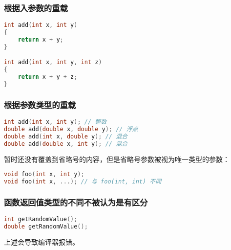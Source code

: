 \documentclass[../../LearnCpp.tex]{subfiles}
\begin{document}
\subsubsection*{根据入参数的重载}

\begin{lstlisting}[language=C++]
int add(int x, int y)
{
    return x + y;
}

int add(int x, int y, int z)
{
    return x + y + z;
}
\end{lstlisting}

\subsubsection*{根据参数类型的重载}

\begin{lstlisting}[language=C++]
int add(int x, int y); // 整数
double add(double x, double y); // 浮点
double add(int x, double y); // 混合
double add(double x, int y); // 混合
\end{lstlisting}

暂时还没有覆盖到省略号的内容，但是省略号参数被视为唯一类型的参数：

\begin{lstlisting}[language=C++]
void foo(int x, int y);
void foo(int x, ...); // 与 foo(int, int) 不同
\end{lstlisting}

\subsubsection*{函数返回值类型的不同不被认为是有区分}

\begin{lstlisting}[language=C++]
int getRandomValue();
double getRandomValue();
\end{lstlisting}

上述会导致编译器报错。
\end{document}
